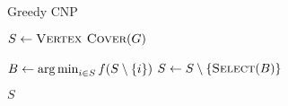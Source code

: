 \begin{algorithm}
  \caption{Greedy CNP}\label{alg:GREEDY_ALGORITMUS}
  \begin{algorithmic}[1]
    \State $S \leftarrow \Call{Vertex Cover}{G}$

    \State $B \leftarrow \operatorname*{arg\,min}_{i \in S} f(S \setminus \left\{ i \right\})$
    \State $S \leftarrow S \setminus \left\{ \Call{Select}{B} \right\}$
    \EndWhile

    \State \Return $S$
    \EndFunction
  \end{algorithmic}
\end{algorithm}
